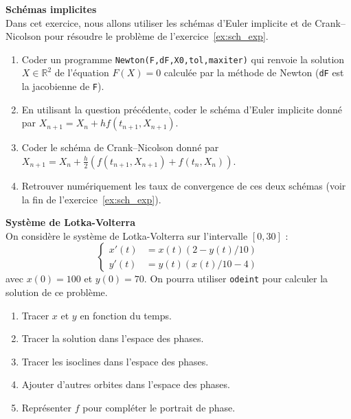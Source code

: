 \documentclass[12pt]{article}
\newcommand{\R}{\mathbb{R}}
\begin{document}
\begin{exo}\textbf{Sch\'emas implicites}\\
  Dans cet exercice, nous allons utiliser les sch\'emas d'Euler implicite et de Crank--Nicolson
  pour r\'esoudre le probl\`eme de l'exercice~\ref{ex:sch_exp}.
\begin{enumerate}
\item Coder un programme \texttt{Newton(F,dF,X0,tol,maxiter)}
  qui renvoie la solution $X \in \R^2$ de l'\'equation $F(X) = 0$
  calcul\'ee par la m\'ethode de Newton (\texttt{dF} est la jacobienne de \texttt{F}).
\item En utilisant la question pr\'ec\'edente, coder le sch\'ema d'Euler implicite donn\'e par
  $X_{n+1} = X_n + h f(t_{n+1} , X_{n+1})$.
\item Coder le sch\'ema de Crank--Nicolson donn\'e par
  $X_{n+1} = X_n + \frac{h}2 (f(t_{n+1} , X_{n+1}) + f(t_{n} , X_{n}))$.
\item Retrouver num\'eriquement les taux de convergence de ces deux sch\'emas
  (voir la fin de l'exercice~\ref{ex:sch_exp}).
\end{enumerate}
\end{exo}



\begin{exo}\textbf{Syst\`eme de Lotka-Volterra}\\
On consid\`ere le syst\`eme de Lotka-Volterra sur l'intervalle $[0,30]$ :
$$
\left\{
\begin{array}{rl}
x'(t)&=x(t)(2-y(t)/10)\\
y'(t)&=y(t)(x(t)/10-4)
\end{array}
\right.
$$
avec %
$x(0)=100$ et $y(0)=70$.
On pourra utiliser \texttt{odeint} pour calculer la solution de ce probl\`eme.
\begin{enumerate}
\item Tracer $x$ et $y$ en fonction du temps.
\item Tracer la solution dans l'espace des phases.
\item Tracer les isoclines dans l'espace des phases. 
\item Ajouter d'autres orbites dans l'espace des phases.
\item Repr\'esenter $f$ pour compl\'eter le portrait de phase.
\end{enumerate}
\end{exo}
\end{document}
